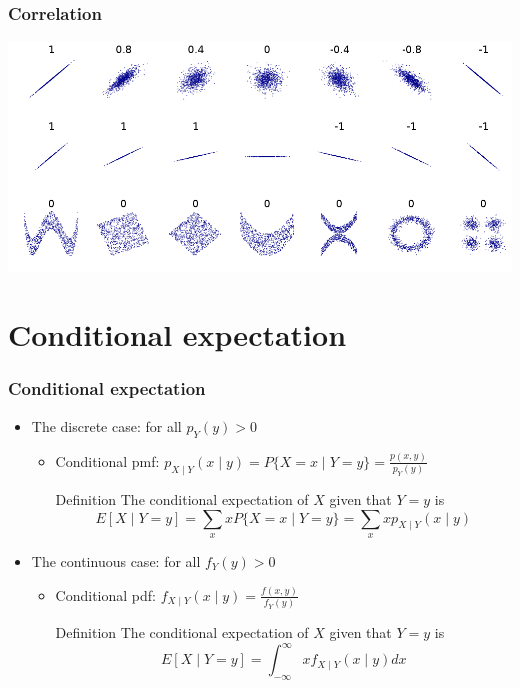 \documentclass[slidestop,compress,mathserif]{beamer}
\begin{document}

\begin{frame}
\frametitle{Correlation}

\vfill

\begin{center}
\includegraphics[width=\textwidth]{figures/corr.png}
\end{center}

\vfill

\end{frame}


\section{Conditional expectation}
\begin{frame}\frametitle{Conditional expectation}
\begin{itemize}
\item The discrete case: for all $p_Y(y) > 0$
\begin{itemize}
\item Conditional pmf: $p_{X \mid Y}(x \mid y) = P\{X = x \mid  Y = y\} = \frac{p(x, y)}{p_Y(y)}$
{\small{
\begin{block}{Definition}
The conditional expectation of $X$ given that $Y = y$ is
$$E[X \mid Y = y] = \sum_x xP\{X = x \mid  Y = y\} = \sum_x xp_{X \mid Y}(x \mid y)$$
\end{block}
}}
\end{itemize}
\pause
\item The continuous case: for all $f_Y(y) > 0$
\begin{itemize}
\item Conditional pdf: $f_{X \mid Y}(x \mid y) = \frac{f(x, y)}{f_Y(y)}$
{\small{
\begin{block}{Definition}
The conditional expectation of $X$ given that $Y = y$ is
$$E[X \mid Y = y] = \int_{-\infty}^{\infty}xf_{X \mid Y}(x \mid y)dx$$
\end{block}
}}
\end{itemize}
\end{itemize}
\end{frame}
\end{document}
